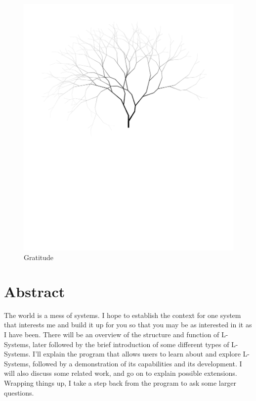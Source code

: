 \documentclass[12pt,twoside]{reedthesis}
\begin{document}
	\begin{figure}[h]
	\centering
	\includegraphics[clip=true, viewport=1in 5.5in 9in 11in, scale=0.44]{Images/Acknowledgements1}
	\caption[Gratitude]{Gratitude\footnotemark}
	\label {Acknowledgements1}
	\end{figure}
	


    \tableofcontents
	\listoffigures

\chapter*{Abstract}
	The world is a mess of systems. I hope to establish the context for one system that interests me and build it up for you so that you may be as interested in it as I have been. There will be an overview of the structure and function of L-Systems, later followed by the brief introduction of some different types of L-Systems. I'll explain the program that allows users to learn about and explore L-Systems, followed by a demonstration of its capabilities and its development. I will also discuss some related work, and go on to explain possible extensions. Wrapping things up, I take a step back from the program to ask some larger questions.
	
\end{document}
